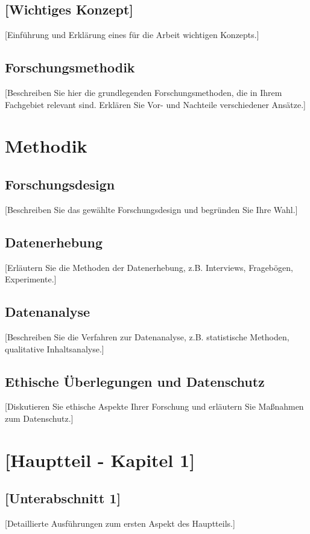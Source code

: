 \documentclass[a4paper,12pt]{article}
\begin{document}
\subsection{[Wichtiges Konzept]}
[Einführung und Erklärung eines für die Arbeit wichtigen Konzepts.]

\subsection{Forschungsmethodik}
[Beschreiben Sie hier die grundlegenden Forschungsmethoden, die in Ihrem Fachgebiet relevant sind. Erklären Sie Vor- und Nachteile verschiedener Ansätze.]

\section{Methodik}
\subsection{Forschungsdesign}
[Beschreiben Sie das gewählte Forschungsdesign und begründen Sie Ihre Wahl.]

\subsection{Datenerhebung}
[Erläutern Sie die Methoden der Datenerhebung, z.B. Interviews, Fragebögen, Experimente.]

\subsection{Datenanalyse}
[Beschreiben Sie die Verfahren zur Datenanalyse, z.B. statistische Methoden, qualitative Inhaltsanalyse.]

\subsection{Ethische Überlegungen und Datenschutz}
[Diskutieren Sie ethische Aspekte Ihrer Forschung und erläutern Sie Maßnahmen zum Datenschutz.]

\section{[Hauptteil - Kapitel 1]}
\subsection{[Unterabschnitt 1]}
[Detaillierte Ausführungen zum ersten Aspekt des Hauptteils.]
\end{document}
